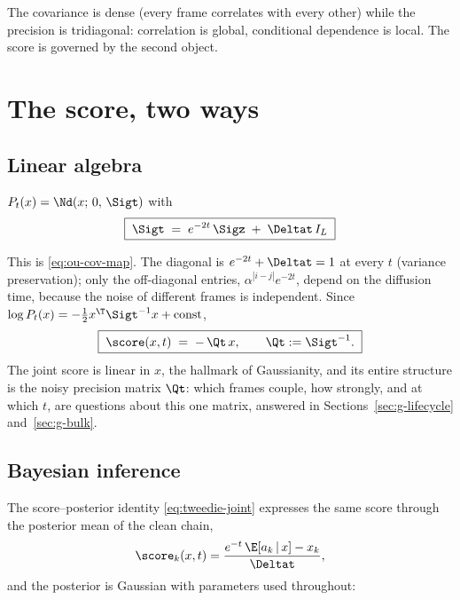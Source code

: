 The covariance is dense (every frame correlates with every other) while
the precision is tridiagonal: correlation is global, conditional
dependence is local. The score is governed by the second object.

\section{The score, two ways}\label{sec:g-score}

\subsection{Linear algebra}

\begin{proposition}\label{prop:g-Sigt}
$P_t(x) = \Nd(x;\, 0,\, \Sigt)$ with
\begin{equation}
  \boxed{\;\Sigt \;=\; e^{-2t}\, \Sigz \;+\; \Deltat\, I_L\;}
  \label{eq:g-Sigt}
\end{equation}
\end{proposition}
This is \eqref{eq:ou-cov-map}. The diagonal is
$e^{-2t} + \Deltat = 1$ at every $t$ (variance preservation); only the
off-diagonal entries, $\alpha^{|i-j|} e^{-2t}$, depend on the diffusion
time, because the noise of different frames is independent. Since
$\log P_t(x) = -\tfrac{1}{2} x^\T \Sigt^{-1} x + \text{const}$,
\begin{equation}
  \boxed{\;\score(x, t) \;=\; -\,\Qt\, x,
  \qquad \Qt := \Sigt^{-1}.\;}
  \label{eq:g-score-matrix}
\end{equation}
The joint score is linear in $x$, the hallmark of Gaussianity, and its
entire structure is the noisy precision matrix $\Qt$: which frames couple,
how strongly, and at which $t$, are questions about this one matrix,
answered in Sections~\ref{sec:g-lifecycle} and~\ref{sec:g-bulk}.

\subsection{Bayesian inference}

The score--posterior identity \eqref{eq:tweedie-joint} expresses the same
score through the posterior mean of the clean chain,
\begin{equation}
  \score_k(x, t)
  = \frac{e^{-t}\, \E[a_k \,|\, x] - x_k}{\Deltat} ,
  \label{eq:g-tweedie}
\end{equation}
and the posterior is Gaussian with parameters used throughout:

